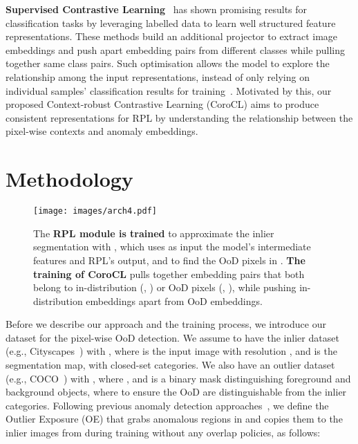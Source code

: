 \documentclass[10pt,twocolumn,letterpaper]{article}
\newcommand{\mycircle}[1]{\tikz{\node[draw=#1, color=white, fill=#1, circle,minimum
width=0.25cm,minimum height=0.25cm,inner sep=0pt, circular drop shadow, very thick] at (0,0) {};}}
\newcommand{\mytriangle}[1]{\tikz{\node[draw=#1, color=white, fill=#1,isosceles
triangle,isosceles triangle stretches,shape border rotate=90,minimum
width=0.25cm,minimum height=0.25cm,inner sep=0pt, drop shadow, very thick] at (0,0) {};}}
\newcommand{\OodCoco}{\protect\mytriangle{ood_outlier}}
\newcommand{\InlierCoco}{\protect\mycircle{ood_inlier}}
\newcommand{\OodCity}{\protect\mytriangle{city_outlier}}
\newcommand{\InlierCity}{\protect\mycircle{city_inlier}}
\begin{document}
\noindent \textbf{Supervised Contrastive Learning}~\cite{khosla2020supervised, wang2021exploring,li2022targeted} has shown promising results for classification tasks by leveraging labelled data to learn well structured feature representations. These methods build an additional projector to extract image embeddings and push apart  embedding pairs from different classes while pulling together same class pairs. Such optimisation allows the model to explore the relationship among the input representations, instead of only relying on individual samples' classification results for training~\cite{wang2021exploring,tian2020makes}. 
Motivated by this, our proposed Context-robust Contrastive Learning (CoroCL) aims to produce consistent representations for RPL by understanding the relationship between the pixel-wise contexts and anomaly embeddings.




\section{Methodology}
\label{sec:methodology}


\begin{figure*}[t!]
    \centering
    \texttt{[image: images/arch4.pdf]}
    \caption{
The \textbf{RPL module is trained} to approximate the inlier segmentation  with  , which uses as input the model's intermediate features and RPL's output, and to find the OoD pixels in  .
\textbf{The training of CoroCL} 
    pulls together embedding pairs that both belong to in-distribution (\InlierCoco, \InlierCity) or OoD pixels (\OodCoco, \OodCity), while pushing in-distribution embeddings apart from OoD embeddings.
}
    \label{fig:draft}
    \vspace{-15 pt}
\end{figure*}


Before we describe our approach and the training process, we introduce our dataset for the pixel-wise OoD detection. We assume to have the inlier dataset (e.g., Cityscapes~\cite{cordts2016cityscapes}) with , where  is the input image with resolution , and  is the segmentation map, with  closed-set categories. We also have an outlier dataset (e.g., COCO~\cite{lin2014microsoft}) with , where
, and 
 is a binary mask distinguishing foreground and background objects, where  to ensure the OoD are distinguishable from the inlier categories. Following previous anomaly detection approaches~\cite{tian2021pixel, grcic2022densehybrid}, we define the Outlier Exposure (OE) that grabs anomalous regions in  and copies them to the inlier images from  during training without any overlap policies, as follows:
 
\end{document}
